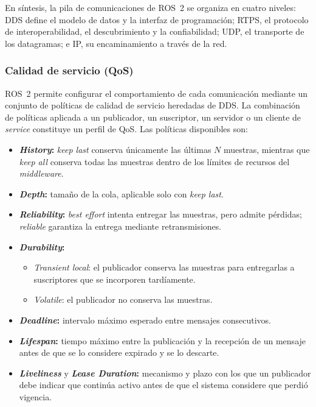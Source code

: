 En síntesis, la pila de comunicaciones de ROS~2 se organiza en cuatro niveles:
DDS define el modelo de datos y la interfaz de programación; RTPS, el protocolo
de interoperabilidad, el descubrimiento y la confiabilidad; UDP, el transporte
de los datagramas; e IP, su encaminamiento a través de la red.

\subsubsection{Calidad de servicio (QoS)}

ROS~2 permite configurar el comportamiento de cada comunicación mediante un
conjunto de políticas de calidad de servicio heredadas de DDS. La combinación
de políticas aplicada a un publicador, un suscriptor, un servidor o un cliente
de \textit{service} constituye un perfil de QoS. Las políticas disponibles son:
\begin{itemize}
    \item \textbf{\textit{History}:} \textit{keep last} conserva únicamente las
    últimas $N$ muestras, mientras que \textit{keep all} conserva todas las
    muestras dentro de los límites de recursos del \textit{middleware}.
    \item \textbf{\textit{Depth}:} tamaño de la cola, aplicable solo con
    \textit{keep last}.
    \item \textbf{\textit{Reliability}:} \textit{best effort} intenta entregar
    las muestras, pero admite pérdidas; \textit{reliable} garantiza la entrega
    mediante retransmisiones.
    \item \textbf{\textit{Durability}:} 
    \begin{itemize}
        \item \textit{Transient local}: el publicador conserva las muestras para entregarlas a suscriptores que se
    incorporen tardíamente.
        \item \textit{Volatile}: el publicador no conserva las muestras.
    \end{itemize}
    \item \textbf{\textit{Deadline}:} intervalo máximo esperado entre mensajes
    consecutivos.
    \item \textbf{\textit{Lifespan}:} tiempo máximo entre la publicación y la
    recepción de un mensaje antes de que se lo considere expirado y se lo
    descarte.
    \item \textbf{\textit{Liveliness}} y \textbf{\textit{Lease Duration}:}
    mecanismo y plazo con los que un publicador debe indicar que continúa
    activo antes de que el sistema considere que perdió vigencia.
\end{itemize}

